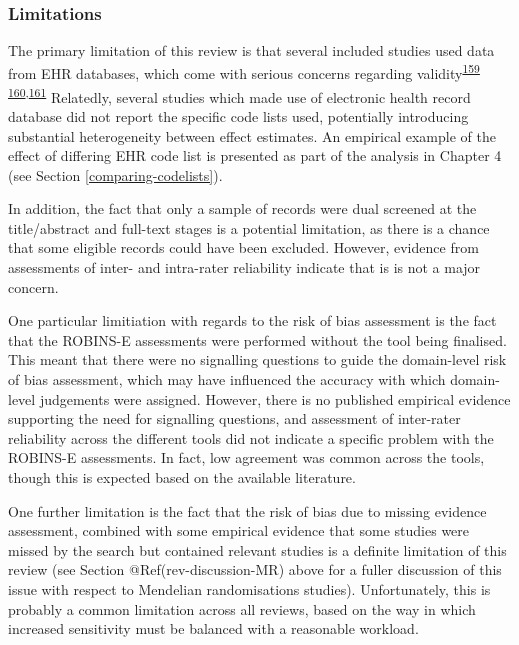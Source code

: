 \documentclass[a4paper, twoside]{templates/ociamthesis}
\begin{document}
~

\hypertarget{limitations}{%
\subsubsection{Limitations}\label{limitations}}

The primary limitation of this review is that several included studies used data from EHR databases, which come with serious concerns regarding validity\textsuperscript{\protect\hyperlink{ref-hsieh2019}{159}} \textsuperscript{\protect\hyperlink{ref-mcguinness2019validity}{160},\protect\hyperlink{ref-wilkinson2018}{161}} Relatedly, several studies which made use of electronic health record database did not report the specific code lists used, potentially introducing substantial heterogeneity between effect estimates. An empirical example of the effect of differing EHR code list is presented as part of the analysis in Chapter 4 (see Section \ref{comparing-codelists}).

In addition, the fact that only a sample of records were dual screened at the title/abstract and full-text stages is a potential limitation, as there is a chance that some eligible records could have been excluded. However, evidence from assessments of inter- and intra-rater reliability indicate that is is not a major concern.

One particular limitiation with regards to the risk of bias assessment is the fact that the ROBINS-E assessments were performed without the tool being finalised. This meant that there were no signalling questions to guide the domain-level risk of bias assessment, which may have influenced the accuracy with which domain-level judgements were assigned. However, there is no published empirical evidence supporting the need for signalling questions, and assessment of inter-rater reliability across the different tools did not indicate a specific problem with the ROBINS-E assessments. In fact, low agreement was common across the tools, though this is expected based on the available literature.

One further limitation is the fact that the risk of bias due to missing evidence assessment, combined with some empirical evidence that some studies were missed by the search but contained relevant studies is a definite limitation of this review (see Section @Ref(rev-discussion-MR) above for a fuller discussion of this issue with respect to Mendelian randomisations studies). Unfortunately, this is probably a common limitation across all reviews, based on the way in which increased sensitivity must be balanced with a reasonable workload.
\end{document}
